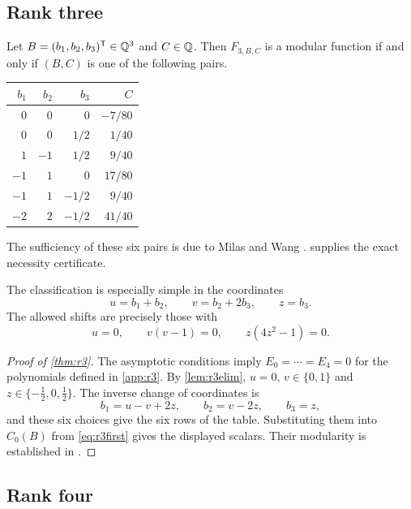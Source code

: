 \subsection{Rank three}

\begin{theorem}\label{thm:r3}
Let $B=(b_1,b_2,b_3)^{\mathsf{T}}\in\mathbb{Q}^3$ and $C\in\mathbb{Q}$. Then $F_{3,B,C}$ is a modular function if and only if $(B,C)$ is one of the following pairs.
\begin{center}
\begin{tabular}{rrrr}
\toprule
$b_1$ & $b_2$ & $b_3$ & $C$\\
\midrule
$0$ & $0$ & $0$ & $-7/80$\\
$0$ & $0$ & $1/2$ & $1/40$\\
$1$ & $-1$ & $1/2$ & $9/40$\\
$-1$ & $1$ & $0$ & $17/80$\\
$-1$ & $1$ & $-1/2$ & $9/40$\\
$-2$ & $2$ & $-1/2$ & $41/40$\\
\bottomrule
\end{tabular}
\end{center}
\end{theorem}

The sufficiency of these six pairs is due to Milas and Wang \cite[Theorems~1.2--1.3]{MW24}.  supplies the exact necessity certificate.

The classification is especially simple in the coordinates
\begin{equation}\label{eq:r3coords}
u=b_1+b_2,\qquad v=b_2+2b_3,\qquad z=b_3.
\end{equation}
The allowed shifts are precisely those with
\begin{equation}\label{eq:r3zeros}
u=0,\qquad v(v-1)=0,\qquad z(4z^2-1)=0.
\end{equation}

\begin{proof}[Proof of \cref{thm:r3}]
The asymptotic conditions imply $E_0=\cdots=E_4=0$ for the polynomials defined in \cref{app:r3}. By \cref{lem:r3elim}, $u=0$, $v\in\{0,1\}$ and $z\in\{-\frac12,0,\frac12\}$. The inverse change of coordinates is
\[
b_1=u-v+2z,\qquad b_2=v-2z,\qquad b_3=z,
\]
and these six choices give the six rows of the table. Substituting them into $C_0(B)$ from \eqref{eq:r3first} gives the displayed scalars. Their modularity is established in \cite{MW24}.
\end{proof}

\subsection{Rank four}

